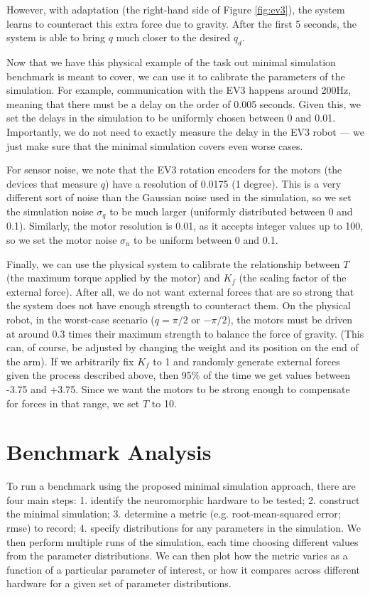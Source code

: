 \documentclass{frontiersSCNS} %
\begin{document}
However, with adaptation (the right-hand side of Figure \ref{fig:ev3}),
the system learns to counteract this extra force due to gravity.  After
the first 5 seconds, the system is able to bring $q$ much closer to the
desired $q_d$.

Now that we have this physical example of the task out minimal simulation
benchmark is meant to cover, we can use it to calibrate the parameters of
the simulation.  For example, communication with the EV3 happens around
200Hz, meaning that there must be a delay on the order of 0.005 seconds.  Given
this, we set the delays in the simulation to be uniformly chosen between
0 and 0.01.  Importantly, we do not need to exactly measure the delay in the
EV3 robot --- we just make sure that the minimal simulation covers even worse
cases.

For sensor noise, we note that the EV3 rotation encoders for the motors (the
devices that measure $q$) have a resolution of 0.0175 (1 degree).  This is a
very different sort of noise than the Gaussian noise used in the simulation,
so we set the simulation noise $\sigma_q$ to be much larger (uniformly distributed
between 0 and 0.1).  Similarly, the motor resolution is 0.01, as it accepts 
integer values up to 100, so we set the motor noise $\sigma_u$ to be uniform between
0 and 0.1.

Finally, we can use the physical system to calibrate the relationship between
$T$ (the maximum torque applied by the motor) and $K_f$ (the scaling factor
of the external force).  After all, we do not want external forces that are
so strong that the system does not have enough strength to counteract them.
On the physical robot, in the worst-case scenario ($q=\pi/2$ or $-\pi/2$),
the motors must be driven at around 0.3 times their maximum strength to
balance the force of gravity.  (This can, of course, be adjusted by changing
the weight and its position on the end of the arm).  If we arbitrarily fix $K_f$ to 1 and randomly
generate external forces given the process described above, then 95\% of
the time we get values between -3.75 and +3.75.  Since we want the motors to
be strong enough to compensate for forces in that range, we set $T$ to 10.

\section{Benchmark Analysis}

To run a benchmark using the proposed
minimal simulation approach, there are four main steps: 1. identify
the neuromorphic hardware to be tested; 2. construct the minimal
simulation; 3. determine a metric (e.g. root-mean-squared error; rmse)
to record; 4. specify distributions for any parameters in the
simulation.  We then perform multiple runs of the simulation, each
time choosing different values from the parameter distributions.  We
can then plot how the metric varies as a function of a particular parameter
of interest, or how it compares across different hardware for a
given set of parameter distributions.
\end{document}
